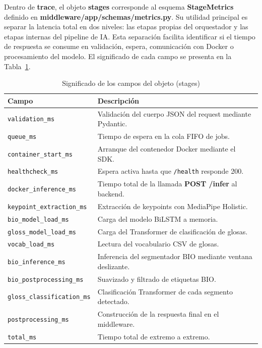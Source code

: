 \documentclass[11pt,a4paper]{article}
\begin{document}
Dentro de \textbf{trace}, el objeto \textbf{stages} corresponde al esquema \textbf{StageMetrics} definido en \textbf{middleware/app/schemas/metrics.py}. Su utilidad principal es separar la latencia total en dos niveles: las etapas propias del orquestador y las etapas internas del pipeline de IA. Esta separación facilita identificar si el tiempo de respuesta se consume en validación, espera, comunicación con Docker o procesamiento del modelo. El significado de cada campo se presenta en la Tabla~\ref{tab:stages_campos}.

\begin{table}[H]
\centering
\caption{Significado de los campos del objeto (stages)}
\label{tab:stages_campos}
\scriptsize
\renewcommand{\arraystretch}{1.08}
\setlength{\tabcolsep}{4pt}

\begin{tabular}{
    >{\raggedright\arraybackslash}p{4.8cm}
    >{\raggedright\arraybackslash}p{8.2cm}
}
\toprule
\textbf{Campo} & \textbf{Descripción} \\
\midrule
\texttt{validation\_ms} & Validación del cuerpo JSON del request mediante Pydantic. \\
\texttt{queue\_ms} & Tiempo de espera en la cola FIFO de jobs. \\
\texttt{container\_start\_ms} & Arranque del contenedor Docker mediante el SDK. \\
\texttt{healthcheck\_ms} & Espera activa hasta que \texttt{/health} responde 200. \\
\texttt{docker\_inference\_ms} & Tiempo total de la llamada \textbf{POST /infer} al backend. \\
\texttt{keypoint\_extraction\_ms} & Extracción de keypoints con MediaPipe Holistic. \\
\texttt{bio\_model\_load\_ms} & Carga del modelo BiLSTM a memoria. \\
\texttt{gloss\_model\_load\_ms} & Carga del Transformer de clasificación de glosas. \\
\texttt{vocab\_load\_ms} & Lectura del vocabulario CSV de glosas. \\
\texttt{bio\_inference\_ms} & Inferencia del segmentador BIO mediante ventana deslizante. \\
\texttt{bio\_postprocessing\_ms} & Suavizado y filtrado de etiquetas BIO. \\
\texttt{gloss\_classification\_ms} & Clasificación Transformer de cada segmento detectado. \\
\texttt{postprocessing\_ms} & Construcción de la respuesta final en el middleware. \\
\texttt{total\_ms} & Tiempo total de extremo a extremo. \\
\bottomrule
\end{tabular}
\end{table}
\end{document}
